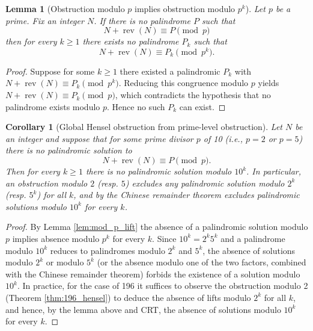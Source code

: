\documentclass[12pt,a4paper]{article}
\newtheorem{lemma}[theorem]{Lemma}
\newtheorem{corollary}[theorem]{Corollary}
\begin{document}
\begin{lemma}[Obstruction modulo $p$ implies obstruction modulo $p^k$]
Let $p$ be a prime. Fix an integer $N$. If there is no palindrome $P$ such that
$$N+\operatorname{rev}(N)\equiv P\pmod p$$
then for every $k\ge1$ there exists no palindrome $P_k$ such that
$$N+\operatorname{rev}(N)\equiv P_k\pmod{p^k}.$$
\end{lemma}

\begin{proof}
Suppose for some $k\ge1$ there existed a palindromic $P_k$ with
$N+\operatorname{rev}(N)\equiv P_k\pmod{p^k}$. Reducing this congruence modulo $p$ yields
$N+\operatorname{rev}(N)\equiv P_k\pmod p$, which contradicts the hypothesis that no palindrome exists modulo $p$. Hence no such $P_k$ can exist.
\end{proof}

\begin{corollary}[Global Hensel obstruction from prime-level obstruction]%
Let $N$ be an integer and suppose that for some prime divisor $p$ of 10 (i.e., $p=2$ or $p=5$) there is no palindromic solution to
$$N+\operatorname{rev}(N)\equiv P\pmod p.$$ Then for every $k\ge1$ there is no palindromic solution modulo $10^k$. In particular, an obstruction modulo $2$ (resp. $5$) excludes any palindromic solution modulo $2^k$ (resp. $5^k$) for all $k$, and by the Chinese remainder theorem excludes palindromic solutions modulo $10^k$ for every $k$.
\end{corollary}

\begin{proof}
By Lemma \ref{lem:mod_p_lift} the absence of a palindromic solution modulo $p$ implies absence modulo $p^k$ for every $k$. Since $10^k=2^k5^k$ and a palindrome modulo $10^k$ reduces to palindromes modulo $2^k$ and $5^k$, the absence of solutions modulo $2^k$ or modulo $5^k$ (or the absence modulo one of the two factors, combined with the Chinese remainder theorem) forbids the existence of a solution modulo $10^k$. In practice, for the case of 196 it suffices to observe the obstruction modulo 2 (Theorem \ref{thm:196_hensel}) to deduce the absence of lifts modulo $2^k$ for all $k$, and hence, by the lemma above and CRT, the absence of solutions modulo $10^k$ for every $k$.
\end{proof}
\end{document}

